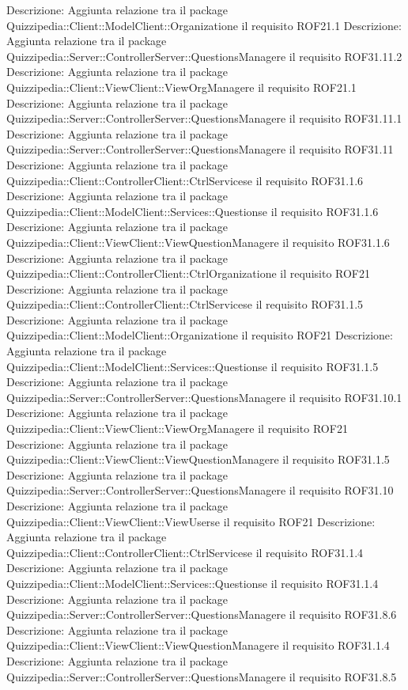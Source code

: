 Descrizione: Aggiunta relazione tra il package Quizzipedia::Client::ModelClient::Organizatione il requisito ROF21.1 
Descrizione: Aggiunta relazione tra il package Quizzipedia::Server::ControllerServer::QuestionsManagere il requisito ROF31.11.2 
Descrizione: Aggiunta relazione tra il package Quizzipedia::Client::ViewClient::ViewOrgManagere il requisito ROF21.1 
Descrizione: Aggiunta relazione tra il package Quizzipedia::Server::ControllerServer::QuestionsManagere il requisito ROF31.11.1 
Descrizione: Aggiunta relazione tra il package Quizzipedia::Server::ControllerServer::QuestionsManagere il requisito ROF31.11 
Descrizione: Aggiunta relazione tra il package Quizzipedia::Client::ControllerClient::CtrlServicese il requisito ROF31.1.6 
Descrizione: Aggiunta relazione tra il package Quizzipedia::Client::ModelClient::Services::Questionse il requisito ROF31.1.6 
Descrizione: Aggiunta relazione tra il package Quizzipedia::Client::ViewClient::ViewQuestionManagere il requisito ROF31.1.6 
Descrizione: Aggiunta relazione tra il package Quizzipedia::Client::ControllerClient::CtrlOrganizatione il requisito ROF21 
Descrizione: Aggiunta relazione tra il package Quizzipedia::Client::ControllerClient::CtrlServicese il requisito ROF31.1.5 
Descrizione: Aggiunta relazione tra il package Quizzipedia::Client::ModelClient::Organizatione il requisito ROF21 
Descrizione: Aggiunta relazione tra il package Quizzipedia::Client::ModelClient::Services::Questionse il requisito ROF31.1.5 
Descrizione: Aggiunta relazione tra il package Quizzipedia::Server::ControllerServer::QuestionsManagere il requisito ROF31.10.1 
Descrizione: Aggiunta relazione tra il package Quizzipedia::Client::ViewClient::ViewOrgManagere il requisito ROF21 
Descrizione: Aggiunta relazione tra il package Quizzipedia::Client::ViewClient::ViewQuestionManagere il requisito ROF31.1.5 
Descrizione: Aggiunta relazione tra il package Quizzipedia::Server::ControllerServer::QuestionsManagere il requisito ROF31.10 
Descrizione: Aggiunta relazione tra il package Quizzipedia::Client::ViewClient::ViewUserse il requisito ROF21 
Descrizione: Aggiunta relazione tra il package Quizzipedia::Client::ControllerClient::CtrlServicese il requisito ROF31.1.4 
Descrizione: Aggiunta relazione tra il package Quizzipedia::Client::ModelClient::Services::Questionse il requisito ROF31.1.4 
Descrizione: Aggiunta relazione tra il package Quizzipedia::Server::ControllerServer::QuestionsManagere il requisito ROF31.8.6 
Descrizione: Aggiunta relazione tra il package Quizzipedia::Client::ViewClient::ViewQuestionManagere il requisito ROF31.1.4 
Descrizione: Aggiunta relazione tra il package Quizzipedia::Server::ControllerServer::QuestionsManagere il requisito ROF31.8.5 
